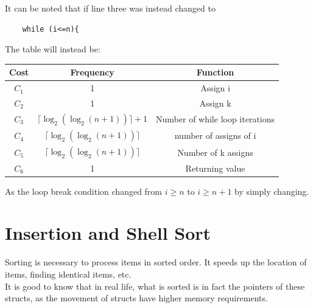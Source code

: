 \documentclass[nobib]{tufte-handout}
\begin{document}
It can be noted that if line three was instead changed to\\
\begin{lstlisting}
    while (i<=n){
\end{lstlisting}
The table will instead be:\\
\begin{table}
    \centering
    \begin{tabular}{c|c|c}
        Cost  & Frequency                            & Function                        \\
        \hline
        $C_1$ & 1                                    & Assign i                        \\
        $C_2$ & 1                                    & Assign k                        \\
        $C_3$ & $\lceil \log_2(\log_2(n+1))\rceil+1$ & Number of while loop iterations \\
        $C_4$ & $\lceil \log_2(\log_2(n+1))\rceil $  & number of assigns of i          \\
        $C_5$ & $\lceil \log_2(\log_2(n+1))\rceil$   & Number of k assigns             \\
        $C_6$ & 1                                    & Returning value                 \\
    \end{tabular}
\end{table}
\FloatBarrier
As the loop break condition changed from $i\geq n$ to $i\geq n+1$ by simply changing.
\section{Insertion and Shell Sort}
Sorting is necessary to process items in sorted order. It speeds up the
location of items, finding identical items, etc. \\ It is good to know that in
real life, what is sorted is in fact the pointers of these structs, as the
movement of structs have higher memory requirements.
\end{document}
